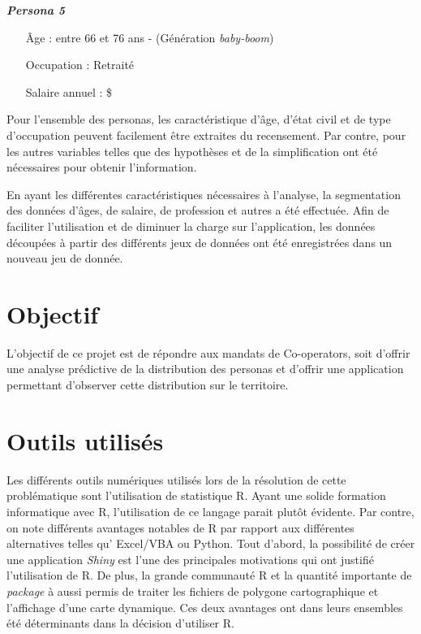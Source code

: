 \documentclass[11pt,french]{article}\usepackage[]{graphicx}\usepackage[]{color}
\newenvironment{userInfo}[1]
	{\begin{mdframed}
	\textcolor{NavyBlue}{\huge \raisebox{-3.5pt}{\faUser} 
	\hspace{0.5cm} \large\bfseries #1}\\[5pt]
	\normalsize
	\makebox[0.1\textwidth][l]{}	
	\begin{minipage}{10cm}}
	{	\end{minipage}
	\end{mdframed}}
\begin{document}
\begin{userInfo}{\color{MidnightBlue}\emph{Persona 5}
     \color{black}}
\label{per5}
\begin{itemize}
\item[Âge :] entre 66 et 76 ans - (Génération \emph{baby-boom})
\item[Occupation :] Retraité
\item[Salaire annuel :]  \$
\end{itemize}
\end{userInfo}
\bigskip

Pour l'ensemble des personas,  les caractéristique d'âge, d’état civil et de type d'occupation peuvent facilement être extraites du recensement. Par contre, pour les autres variables telles que  des hypothèses et de la simplification ont été nécessaires pour obtenir l'information.
\newline

En ayant les différentes caractéristiques nécessaires à l’analyse, la segmentation des données d’âges, de salaire, de profession et autres a été effectuée. Afin de faciliter l’utilisation et de diminuer la charge sur l’application, les données découpées à partir des différents jeux de données ont été enregistrées dans un nouveau jeu de donnée.

\section{Objectif}

L'objectif de ce projet est de répondre aux mandats de Co-operators, soit d'offrir une analyse prédictive de la distribution des personas et d'offrir une application permettant d'observer cette distribution sur le territoire.

\section{Outils utilisés}

Les différents outils numériques utilisés lors de la résolution de cette problématique sont l'utilisation de statistique R. Ayant une solide formation informatique avec R, l'utilisation de ce langage parait plutôt évidente. Par contre, on note différents avantages notables de R par rapport aux différentes alternatives telles qu’ Excel/VBA ou Python. Tout d'abord, la possibilité de créer une application \emph{Shiny} est l'une des principales motivations qui ont justifié l'utilisation de R. De plus, la grande communauté R et la quantité importante de \emph{package} à aussi permis de traiter les fichiers de polygone cartographique et l'affichage d'une carte dynamique. Ces deux avantages ont dans leurs ensembles été déterminants dans la décision d'utiliser R.
\bigskip
\end{document}
